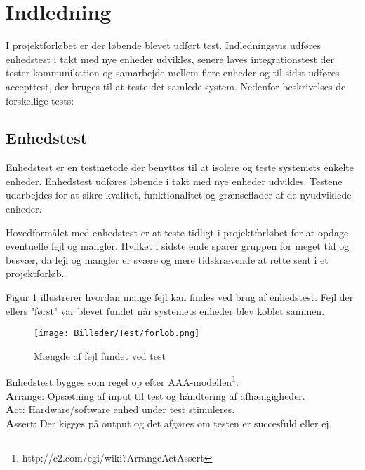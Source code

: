 \section{Indledning}

I projektforløbet er der løbende blevet udført test. Indledningsvis udføres enhedstest i takt med nye enheder udvikles, senere laves integrationstest der tester kommunikation og samarbejde mellem flere enheder og til sidst udføres accepttest, der bruges til at teste det samlede system. Nedenfor beskrivelses de forskellige tests:


\subsection{Enhedstest} 
\vspace{-0.5cm}
Enhedstest er en testmetode der benyttes til at isolere og teste systemets enkelte enheder. Enhedstest udføres løbende i takt med nye enheder udvikles. Testene udarbejdes for at sikre kvalitet, funktionalitet og grænseflader af de nyudviklede enheder. 

Hovedformålet med enhedstest er at teste tidligt i projektforløbet for at opdage eventuelle fejl og mangler. Hvilket i sidste ende sparer gruppen for meget tid og besvær, da fejl og mangler er svære og mere tidskrævende at rette sent i et projektforløb.

Figur \ref{fig:test_forlob} illustrerer hvordan mange fejl kan findes ved brug af enhedstest. Fejl der ellers "først" var blevet fundet når systemets enheder blev koblet sammen.
\vspace{-0.4cm}
\begin{figure}[H]
	\centering
	\texttt{[image: Billeder/Test/forlob.png]}
	\vspace{-0.4cm}
	\caption{Mængde af fejl fundet ved test}
	\label{fig:test_forlob}
\end{figure}

\vspace{0.5cm}

Enhedstest bygges som regel op efter AAA-modellen\footnote{http://c2.com/cgi/wiki?ArrangeActAssert}.\\ 
\textbf{A}rrange: Opsætning af input til test og håndtering af afhængigheder. \\
\textbf{A}ct: Hardware/software enhed under test stimuleres. \\
\textbf{A}ssert: Der kigges på output og det afgøres om testen er succesfuld eller ej.

